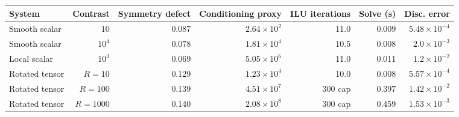 \begin{tabularx}{\textwidth}{Xrrrrrr}
\toprule
System & Contrast & Symmetry defect & Conditioning proxy & ILU iterations & Solve (s) & Disc. error \\
\midrule
Smooth scalar & $10$ & 0.087 & $2.64\times10^2$ & 11.0 & 0.009 & $5.48\times10^{-4}$ \\
Smooth scalar & $10^4$ & 0.078 & $1.81\times10^4$ & 10.5 & 0.008 & $2.0\times10^{-3}$ \\
Local scalar & $10^3$ & 0.069 & $5.05\times10^6$ & 11.0 & 0.011 & $1.2\times10^{-2}$ \\
Rotated tensor & $R=10$ & 0.129 & $1.23\times10^4$ & 10.0 & 0.008 & $5.57\times10^{-4}$ \\
Rotated tensor & $R=100$ & 0.139 & $4.51\times10^7$ & 300 cap & 0.397 & $1.42\times10^{-2}$ \\
Rotated tensor & $R=1000$ & 0.140 & $2.08\times10^8$ & 300 cap & 0.459 & $1.53\times10^{-3}$ \\
\bottomrule
\end{tabularx}
